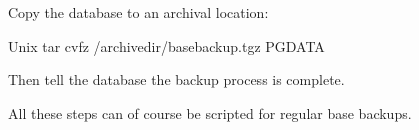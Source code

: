 \documentclass[a4paper,11pt,english]{sphinxmanual}
\begin{document}
Copy the database to an archival location:

\begin{sphinxVerbatim}[commandchars=\\\{\}]
\PYGZsh{} Unix
tar cvfz /archivedir/basebackup.tgz \PYGZdl{}\PYGZob{}PGDATA\PYGZcb{}
\end{sphinxVerbatim}

Then tell the database the backup process is complete.

\begin{sphinxVerbatim}[commandchars=\\\{\}]
 
\end{sphinxVerbatim}

All these steps can of course be scripted for regular base backups.
\end{document}
